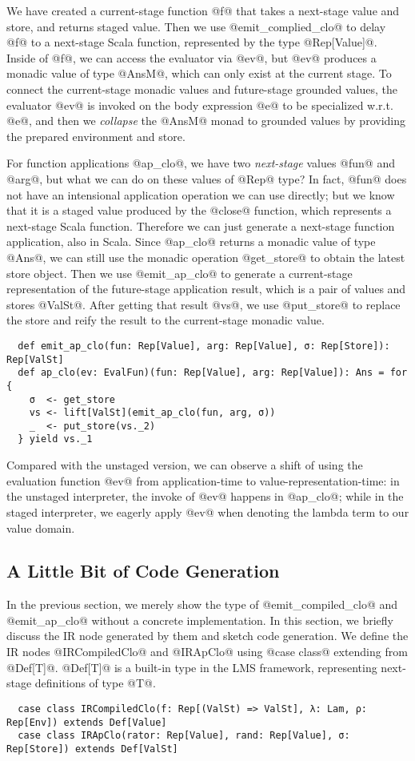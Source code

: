 We have created a current-stage function @f@ that takes a next-stage value and
store, and returns staged value. Then we use @emit_complied_clo@ to delay @f@ to
a next-stage Scala function, represented by the type @Rep[Value]@. Inside of
@f@, we can access the evaluator via @ev@, but @ev@ produces a monadic value of
type @AnsM@, which can only exist at the current stage. To connect the
current-stage monadic values and future-stage grounded values, the evaluator
@ev@ is invoked on the body expression @e@ to be specialized w.r.t. @e@, and
then we \textit{collapse} the @AnsM@ monad to grounded values by providing the
prepared environment and store.

For function applications @ap_clo@, we have two \textit{next-stage} values @fun@
and @arg@, but what we can do on these values of @Rep@ type? In fact, @fun@ does
not have an intensional application operation we can use directly; but we know
that it is a staged value produced by the @close@ function, which represents a
next-stage Scala function. Therefore we can just generate a next-stage function
application, also in Scala. Since @ap_clo@ returns a monadic value of type
@Ans@, we can still use the monadic operation @get_store@ to obtain the latest
store object. Then we use @emit_ap_clo@ to generate a current-stage
representation of the future-stage application result, which is a pair of values
and stores @ValSt@. After getting that result @vs@, we use @put_store@ to
replace the store and reify the result to the current-stage monadic value.
\begin{lstlisting}
  def emit_ap_clo(fun: Rep[Value], arg: Rep[Value], σ: Rep[Store]): Rep[ValSt]
  def ap_clo(ev: EvalFun)(fun: Rep[Value], arg: Rep[Value]): Ans = for {
    σ  <- get_store
    vs <- lift[ValSt](emit_ap_clo(fun, arg, σ))
    _  <- put_store(vs._2)
  } yield vs._1
\end{lstlisting}

Compared with the unstaged version, we can observe a shift of using the
evaluation function @ev@ from application-time to value-representation-time: in
the unstaged interpreter, the invoke of @ev@ happens in @ap_clo@; while in the
staged interpreter, we eagerly apply @ev@ when denoting the lambda term to our
value domain.

\subsection{A Little Bit of Code Generation}

In the previous section, we merely show the type of @emit_compiled_clo@ and
@emit_ap_clo@ without a concrete implementation. In this section, we briefly
discuss the IR node generated by them and sketch code generation.
We define the IR nodes @IRCompiledClo@ and @IRApClo@ using @case class@
extending from @Def[T]@. @Def[T]@ is a built-in type in the LMS framework,
representing next-stage definitions of type @T@.
\begin{lstlisting}
  case class IRCompiledClo(f: Rep[(ValSt) => ValSt], λ: Lam, ρ: Rep[Env]) extends Def[Value]
  case class IRApClo(rator: Rep[Value], rand: Rep[Value], σ: Rep[Store]) extends Def[ValSt]
\end{lstlisting}

